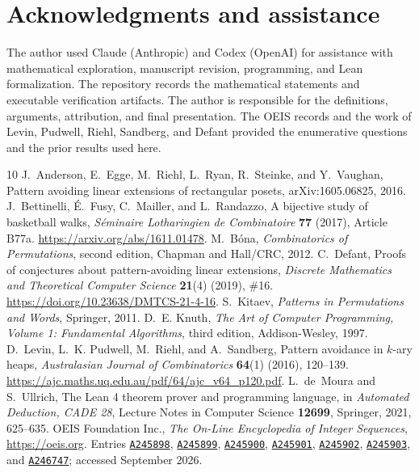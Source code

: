 \documentclass[11pt]{article}
\theoremstyle{definition}
\newcommand{\seq}[1]{\href{https://oeis.org/#1}{\texttt{#1}}}
\begin{document}
\section*{Acknowledgments and assistance}
The author used Claude (Anthropic) and Codex (OpenAI) for assistance with mathematical exploration, manuscript revision, programming, and Lean formalization. The repository records the mathematical statements and executable verification artifacts. The author is responsible for the definitions, arguments, attribution, and final presentation. The OEIS records and the work of Levin, Pudwell, Riehl, Sandberg, and Defant provided the enumerative questions and the prior results used here.

\clearpage
\begin{thebibliography}{10}
 J.~Anderson, E.~Egge, M.~Riehl, L.~Ryan, R.~Steinke, and Y.~Vaughan, Pattern avoiding linear extensions of rectangular posets, arXiv:1605.06825, 2016.
 J.~Bettinelli, \'E.~Fusy, C.~Mailler, and L.~Randazzo, A bijective study of basketball walks, \emph{S\'eminaire Lotharingien de Combinatoire} \textbf{77} (2017), Article B77a. \url{https://arxiv.org/abs/1611.01478}.
 M.~B\'ona, \emph{Combinatorics of Permutations}, second edition, Chapman and Hall/CRC, 2012.
 C.~Defant, Proofs of conjectures about pattern-avoiding linear extensions, \emph{Discrete Mathematics and Theoretical Computer Science} \textbf{21}(4) (2019), \#16. \url{https://doi.org/10.23638/DMTCS-21-4-16}.
 S.~Kitaev, \emph{Patterns in Permutations and Words}, Springer, 2011.
 D.~E. Knuth, \emph{The Art of Computer Programming, Volume 1: Fundamental Algorithms}, third edition, Addison-Wesley, 1997.
 D.~Levin, L.~K. Pudwell, M.~Riehl, and A.~Sandberg, Pattern avoidance in $k$-ary heaps, \emph{Australasian Journal of Combinatorics} \textbf{64}(1) (2016), 120--139. \url{https://ajc.maths.uq.edu.au/pdf/64/ajc_v64_p120.pdf}.
 L.~de~Moura and S.~Ullrich, The Lean 4 theorem prover and programming language, in \emph{Automated Deduction, CADE 28}, Lecture Notes in Computer Science \textbf{12699}, Springer, 2021, 625--635.
 OEIS Foundation Inc., \emph{The On-Line Encyclopedia of Integer Sequences}, \url{https://oeis.org}. Entries \seq{A245898}, \seq{A245899}, \seq{A245900}, \seq{A245901}, \seq{A245902}, \seq{A245903}, and \seq{A246747}; accessed September 2026.
\end{thebibliography}
\end{document}
